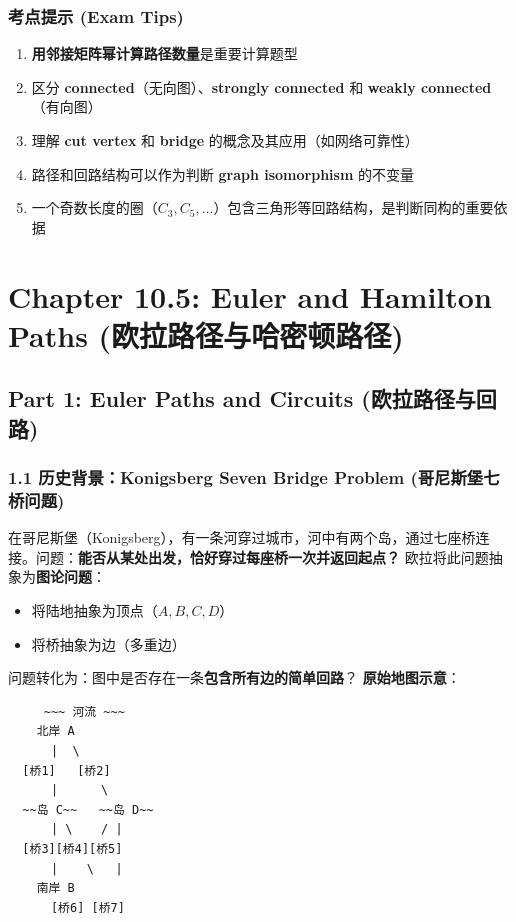 \documentclass[10pt,a4paper,openany]{ctexbook}
\theoremstyle{definition}
\theoremstyle{remark}
\begin{document}
\subsubsection{考点提示 (Exam Tips)}

\begin{enumerate}
\item \textbf{用邻接矩阵幂计算路径数量}是重要计算题型
\item 区分 \textbf{connected}（无向图）、\textbf{strongly connected} 和 \textbf{weakly connected}（有向图）
\item 理解 \textbf{cut vertex} 和 \textbf{bridge} 的概念及其应用（如网络可靠性）
\item 路径和回路结构可以作为判断 \textbf{graph isomorphism} 的不变量
\item 一个奇数长度的圈（$C_3, C_5, \dots$）包含三角形等回路结构，是判断同构的重要依据

\end{enumerate}


\section{Chapter 10.5: Euler and Hamilton Paths (欧拉路径与哈密顿路径)}

\vspace{-2pt}

\subsection{Part 1: Euler Paths and Circuits (欧拉路径与回路)}

\subsubsection{1.1 历史背景：Konigsberg Seven Bridge Problem (哥尼斯堡七桥问题)}

在哥尼斯堡（Konigsberg），有一条河穿过城市，河中有两个岛，通过七座桥连接。问题：\textbf{能否从某处出发，恰好穿过每座桥一次并返回起点？}
欧拉将此问题抽象为\textbf{图论问题}：
\begin{itemize}
\item 将陆地抽象为顶点（$A, B, C, D$）
\item 将桥抽象为边（多重边）
\end{itemize}

问题转化为：图中是否存在一条\textbf{包含所有边的简单回路}？
\textbf{原始地图示意}：
{\footnotesize\begin{verbatim}
     ~~~ 河流 ~~~
    北岸 A
      |  \
  [桥1]   [桥2]
      |      \
  ~~岛 C~~   ~~岛 D~~
      | \    / |
  [桥3][桥4][桥5]
      |    \   |
    南岸 B
      [桥6] [桥7]
\end{verbatim}}
\end{document}
